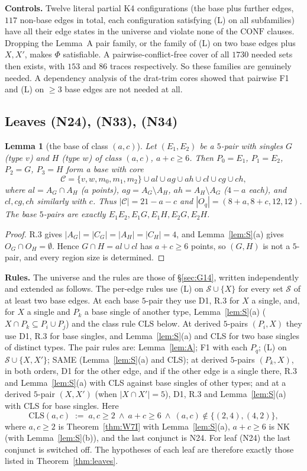 \documentclass[11pt]{amsart}
\newtheorem{lemma}[theorem]{Lemma}
\theoremstyle{definition}
\newcommand{\Conf}{\mathrm{CONF}}
\begin{document}
\textbf{Controls.} Twelve literal partial K4 configurations (the base plus further edges, $117$ non-base edges in total, each configuration satisfying (L) on all subfamilies) have all their edge states in the universe and violate none of the $\Conf$ clauses. Dropping the Lemma~A pair family, or the family of (L) on two base edges plus $X,X'$, makes $\Phi$ satisfiable. A pairwise-conflict-free cover of all $1730$ needed sets then exists, with $153$ and $86$ traces respectively. So these families are genuinely needed. A dependency analysis of the drat-trim cores showed that pairwise F1 and (L) on $\ge3$ base edges are not needed at all.

\subsection{Leaves (N24), (N33), (N34)}\label{sec:noK4}
\begin{lemma}[the base of class $(a,c)$]\label{lem:nok4base}
Let $(E_1,E_2)$ be a $5$-pair with singles $G$ (type $v$) and $H$ (type $w$) of class $(a,c)$, $a+c\ge 6$. Then $P_0=E_1$, $P_1=E_2$, $P_2=G$, $P_3=H$ form a base with core
\[\mathcal C=\{v,w,m_0,m_1,m_2\}\cup al\cup ag\cup ah\cup cl\cup cg\cup ch,\]
where $al=A_G\cap A_H$ ($a$ points), $ag=A_G\setminus A_H$, $ah=A_H\setminus A_G$ ($4-a$ each), and $cl,cg,ch$ similarly with $c$. Thus $|\mathcal C|=21-a-c$ and $|O_q|=(8+a,8+c,12,12)$. The base $5$-pairs are exactly $E_1E_2,E_1G,E_1H,E_2G,E_2H$.
\end{lemma}
\begin{proof}
R.3 gives $|A_G|=|C_G|=|A_H|=|C_H|=4$, and Lemma~\ref{lem:S}(a) gives $O_G\cap O_H=\emptyset$. Hence $G\cap H=al\cup cl$ has $a+c\ge 6$ points, so $(G,H)$ is not a $5$-pair, and every region size is determined.
\end{proof}

\textbf{Rules.} The universe and the rules are those of \S\ref{sec:G14}, written independently and extended as follows. The per-edge rules use (L) on $\mathcal S\cup\{X\}$ for every set $\mathcal S$ of at least two base edges. At each base $5$-pair they use D1, R.3 for $X$ a single, and, for $X$ a single and $P_k$ a base single of another type, Lemma~\ref{lem:S}(a) ($X\cap P_k\subseteq P_i\cup P_j$) and the class rule $\mathrm{CLS}$ below. At derived $5$-pairs $(P_i,X)$ they use D1, R.3 for base singles, and Lemma~\ref{lem:S}(a) and CLS for two base singles of distinct types. The pair rules are: Lemma~\ref{lem:A}; F1 with each $P_q$; (L) on $\mathcal S\cup\{X,X'\}$; SAME (Lemma~\ref{lem:S}(a) and CLS); at derived $5$-pairs $(P_k,X)$, in both orders, D1 for the other edge, and if the other edge is a single there, R.3 and Lemma~\ref{lem:S}(a) with CLS against base singles of other types; and at a derived $5$-pair $(X,X')$ (when $|X\cap X'|=5$), D1, R.3 and Lemma~\ref{lem:S}(a) with CLS for base singles. Here
\[\mathrm{CLS}(a,c)\;:=\;a,c\ge2\ \wedge\ a+c\ge6\ \wedge\ (a,c)\notin\{(2,4),(4,2)\},\]
where $a,c\ge2$ is Theorem~\ref{thm:W7I} with Lemma~\ref{lem:S}(a), $a+c\ge6$ is NK (with Lemma~\ref{lem:S}(b)), and the last conjunct is N24. For leaf (N24) the last conjunct is switched off. The hypotheses of each leaf are therefore exactly those listed in Theorem~\ref{thm:leaves}.
\end{document}
